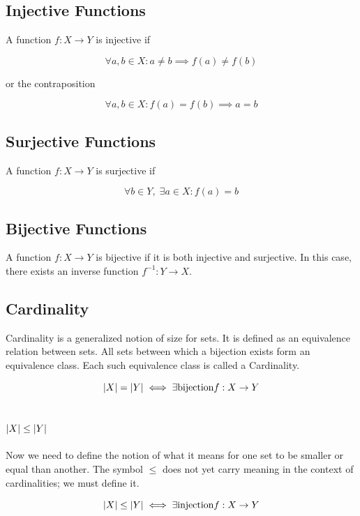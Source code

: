\documentclass[11pt,a4paper]{article}
\begin{document}
\subsection{Injective Functions}

A function $f: X \to Y$ is injective if

\[
  \forall a, b \in X: a \neq b \implies f(a) \neq f(b)
\]

or the contraposition

\[
  \forall a, b \in X: f(a) = f(b) \implies a = b
\]

\subsection{Surjective Functions}

A function $f: X\to Y$ is surjective if

\[
  \forall b \in Y,\; \exists a \in X : f(a) = b
\]

\subsection{Bijective Functions}

A function $f: X \to Y$ is bijective if it is both injective and surjective.
In this case, there exists an inverse function $f^{-1} : Y \to X$.

\subsection{Cardinality}

Cardinality is a generalized notion of size for sets. It is defined as an equivalence
relation between sets. All sets between which a bijection exists form an equivalence
class. Each such equivalence class is called a Cardinality.

\begin{equation}
  \abs{X} = \abs{Y} \iff \exists \text{bijection} f: X \to Y
\end{equation}

\subsection{$\abs{X} \leq \abs{Y}$}

Now we need to define the notion of what it means for one set to be smaller
or equal than another. The symbol $\leq$ does not yet carry meaning in the
context of cardinalities; we must define it.

\begin{equation}
  \abs{X} \leq \abs{Y} \iff \exists \text{injection} f: X \to Y
\end{equation}
\end{document}
